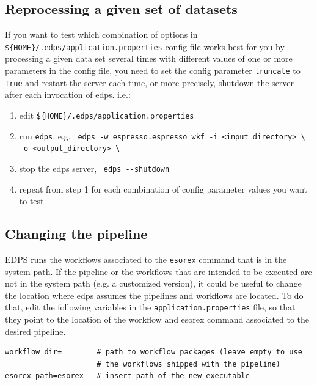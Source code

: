 
\subsection{Reprocessing a given set of datasets}
\label{sec:edps_reprocess}

If you want to test which combination of options in \verb|${HOME}/.edps/application.properties| config file works best for you by processing a given data set several times with different values of one or more parameters in the config file, you need to set the config parameter \verb|truncate| to \verb|True| and restart the server each time, or more precisely, shutdown the server after each invocation of edps. i.e.:

\begin{enumerate}
    \item edit \verb|${HOME}/.edps/application.properties|
    \item run \verb|edps|, e.g.\ \newline
    \verb|edps -w espresso.espresso_wkf -i <input_directory> \|\newline
    \verb|  -o <output_directory> \|
    \item stop the edps server,\ \newline
    \verb|edps --shutdown|
    \item repeat from step 1 for each combination of config parameter values you want to test
\end{enumerate}


\subsection{Changing the pipeline}
\label{sec:setup}
EDPS runs the workflows associated to the {\tt esorex} command that is in the system path.
 If the pipeline or the workflows that are intended to be executed are not in the system path (e.g. a customized version), it could be useful to change the location where edps assumes the pipelines and workflows are located. To do that, edit the following variables in the {\tt application.properties} file, so that they point to the location of the workflow and esorex command associated to the desired pipeline.
\begin{verbatim}
workflow_dir=        # path to workflow packages (leave empty to use
                     # the workflows shipped with the pipeline)
esorex_path=esorex   # insert path of the new executable
\end{verbatim}

